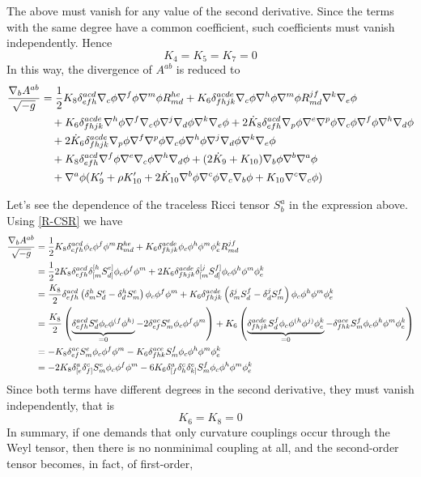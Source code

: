 The above must vanish for any value of the second derivative. Since the terms with the same degree have a common coefficient, such coefficients must vanish independently. Hence
\begin{equation}
  K_4=K_5=K_7=0
\end{equation}
In this way, the divergence of $A^{ab}$ is reduced to
\begin{align*}
    \frac{\nabla_b A^{ab}}{\sqrt{-g}}&= \frac{1}{2}K_8\delta^{acd}_{efh}\nabla_c\phi \nabla^f\phi \nabla^m\phi R^{he}_{md}+K_6\delta^{acde}_{fhjk}\nabla_c\phi \nabla^h\phi \nabla^m\phi R^{jf}_{md}\nabla^k\nabla_e\phi\\&\quad +K_6\delta^{acde}_{fhjk}\nabla^h\phi \nabla^f\nabla_c\phi \nabla^j\nabla_d\phi \nabla^k\nabla_e\phi +2\dot{K}_8\delta^{acd}_{efh}\nabla_p\phi \nabla^{e}\nabla^p\phi \nabla_c\phi\nabla^f\phi\nabla^h\nabla_d\phi \\ &\quad+2\dot{K}_6\delta^{acde}_{fhjk}\nabla_p\phi \nabla^f\nabla^p\phi \nabla_c\phi \nabla^h\phi \nabla^j\nabla_d\phi\nabla^k\nabla_e\phi \\
  &\quad+K_8\delta^{acd}_{efh}\nabla^f\phi\nabla^{e}\nabla_c\phi \nabla^h\nabla_d\phi +(2\dot{K}_9+K_{10})\nabla_b\phi \nabla^b\nabla^{a}\phi \\
  &\quad+\nabla^{a}\phi (K_9'+\rho K_{10}'+2\dot{K}_{10}\nabla^b\phi \nabla^c\phi \nabla_c\nabla_b\phi +K_{10}\nabla^c\nabla_c\phi )
\end{align*}

Let's see the dependence of the traceless Ricci tensor $S^{a}_b$ in the expression above. Using \eqref{R-CSR} we have
\begin{align*}
  \frac{\nabla_bA^{ab}}{\sqrt{-g}}&=\frac{1}{2}K_8\delta^{acd}_{efh}\phi_c\phi^f\phi^m R^{he}_{md}+K_6\delta^{acde}_{fhjk}\phi_c\phi^h\phi^m\phi^k_e R^{jf}_{md}\\
  &=\frac{1}{2}2K_8\delta^{acd}_{efh}\delta^{[h}_{[m}S^{e]}_{d]}\phi_c\phi^f\phi^m +2K_6\delta^{acde}_{fhjk}\delta^{[j}_{[m}S^{f]}_{d]}\phi_c\phi^h\phi^m\phi^k_e\\
  &=\frac{K_8}{2}\delta^{acd}_{efh}\left(\delta^h_mS^{e}_d-\delta^h_dS^{e}_m\right)\phi_c\phi^f\phi^m+K_6\delta^{acde}_{fhjk}\left(\delta^j_mS^f_d-\delta^j_dS^f_m\right)\phi_c\phi^h\phi^m\phi^k_e\\
  &=\frac{K_8}{2}\left(\underbrace{\delta^{acd}_{efh}S^{e}_d\phi_c\phi^{(f}\phi^{h)}}_{=0}-2\delta^{ac}_{ef}S^{e}_m\phi_c\phi^f\phi^m\right)+K_6\left(\underbrace{\delta^{acde}_{fhjk}S^f_d\phi_c\phi^{(h}\phi^{j)}\phi^k_e}_{=0}-\delta^{ace}_{fhk}S^f_m\phi_c\phi^h\phi^m\phi^k_e\right)\\
  &=-K_8\delta^{ac}_{ef}S^{e}_m\phi_c\phi^f\phi^m-K_6\delta^{ace}_{fhk}S^f_m\phi_c\phi^h\phi^m\phi^k_e\\
  &=-2K_8\delta^{a}_{[e}\delta^{c}_{f]}S^{e}_m\phi_c\phi^f\phi^m-6K_6\delta^{a}_{[f}\delta^{c}_{h}\delta^{e}_{k]}S^f_m\phi_c\phi^h\phi^m\phi^k_e
\end{align*}
Since both terms have different degrees in the second derivative, they must vanish independently, that is 
\begin{equation}
  K_6=K_8=0
\end{equation}
In summary, if one demands that only curvature couplings occur through the Weyl tensor, then there is no nonminimal coupling at all, and the second-order tensor becomes, in fact, of first-order,

